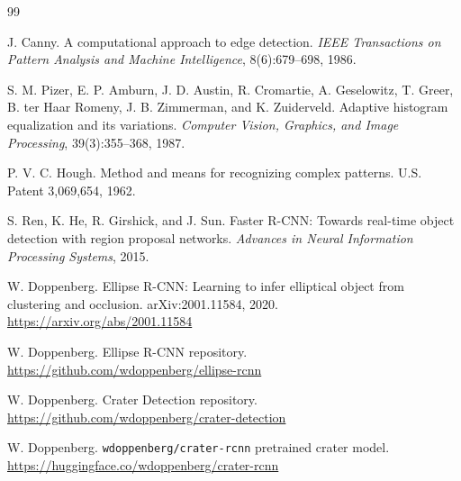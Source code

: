 \documentclass[12pt,a4paper]{article}
\begin{document}
\begin{thebibliography}{99}

J. Canny.
\newblock A computational approach to edge detection.
\newblock \textit{IEEE Transactions on Pattern Analysis and Machine Intelligence}, 8(6):679--698, 1986.

S. M. Pizer, E. P. Amburn, J. D. Austin, R. Cromartie, A. Geselowitz, T. Greer, B. ter Haar Romeny, J. B. Zimmerman, and K. Zuiderveld.
\newblock Adaptive histogram equalization and its variations.
\newblock \textit{Computer Vision, Graphics, and Image Processing}, 39(3):355--368, 1987.

P. V. C. Hough.
\newblock Method and means for recognizing complex patterns.
\newblock U.S. Patent 3,069,654, 1962.

S. Ren, K. He, R. Girshick, and J. Sun.
\newblock Faster R-CNN: Towards real-time object detection with region proposal networks.
\newblock \textit{Advances in Neural Information Processing Systems}, 2015.

W. Doppenberg.
\newblock Ellipse R-CNN: Learning to infer elliptical object from clustering and occlusion.
\newblock arXiv:2001.11584, 2020.
\newblock \url{https://arxiv.org/abs/2001.11584}

W. Doppenberg.
\newblock Ellipse R-CNN repository.
\newblock \url{https://github.com/wdoppenberg/ellipse-rcnn}

W. Doppenberg.
\newblock Crater Detection repository.
\newblock \url{https://github.com/wdoppenberg/crater-detection}

W. Doppenberg.
\newblock \texttt{wdoppenberg/crater-rcnn} pretrained crater model.
\newblock \url{https://huggingface.co/wdoppenberg/crater-rcnn}

\end{thebibliography}
\end{document}
